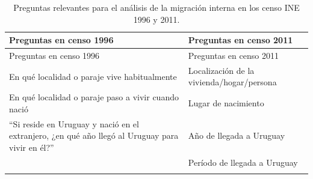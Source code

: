 \documentclass[12pt,spanish,]{article}
\begin{document}
\begin{longtable}[]{@{}ll@{}}
\caption{Preguntas relevantes para el análisis de la migración interna
en los censo INE 1996 y 2011.}\tabularnewline
\toprule
\begin{minipage}[b]{0.47\columnwidth}\raggedright
Preguntas en censo 1996\strut
\end{minipage} & \begin{minipage}[b]{0.47\columnwidth}\raggedright
Preguntas en censo 2011\strut
\end{minipage}\tabularnewline
\midrule
\endfirsthead
\toprule
\begin{minipage}[b]{0.47\columnwidth}\raggedright
Preguntas en censo 1996\strut
\end{minipage} & \begin{minipage}[b]{0.47\columnwidth}\raggedright
Preguntas en censo 2011\strut
\end{minipage}\tabularnewline
\midrule
\endhead
\begin{minipage}[t]{0.47\columnwidth}\raggedright
En qué localidad o paraje vive habitualmente\strut
\end{minipage} & \begin{minipage}[t]{0.47\columnwidth}\raggedright
Localización de la vivienda/hogar/persona\strut
\end{minipage}\tabularnewline
\begin{minipage}[t]{0.47\columnwidth}\raggedright
En qué localidad o paraje paso a vivir cuando nació\strut
\end{minipage} & \begin{minipage}[t]{0.47\columnwidth}\raggedright
Lugar de nacimiento\strut
\end{minipage}\tabularnewline
\begin{minipage}[t]{0.47\columnwidth}\raggedright
``Si reside en Uruguay y nació en el extranjero, ¿en qué año llegó al
Uruguay para vivir en él?''\strut
\end{minipage} & \begin{minipage}[t]{0.47\columnwidth}\raggedright
Año de llegada a Uruguay\strut
\end{minipage}\tabularnewline
\begin{minipage}[t]{0.47\columnwidth}\raggedright
\strut
\end{minipage} & \begin{minipage}[t]{0.47\columnwidth}\raggedright
Período de llegada a Uruguay\strut
\end{minipage}\tabularnewline
\begin{minipage}[t]{0.47\columnwidth}\raggedright

\end{minipage}
\end{longtable}
\end{document}
